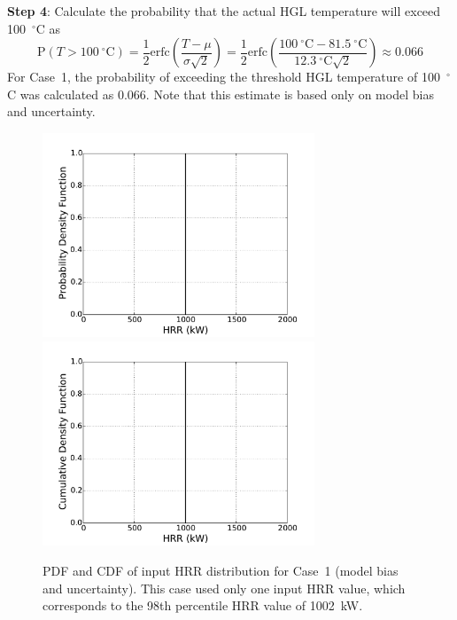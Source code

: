 \documentclass[12pt]{article}
\begin{document}
\textbf{Step 4}: Calculate the probability that the actual HGL temperature will exceed 100~$^\circ$C as
\begin{equation}
\textrm{P}(T > 100~^\circ\textrm{C}) = \frac{1}{2} \textrm{erfc} \left( \frac{T - \mu}{\sigma \sqrt{2}} \right) = \frac{1}{2} \textrm{erfc} \left( \frac{100~^\circ\textrm{C} - 81.5~^\circ\textrm{C}}{12.3~^\circ\textrm{C} \sqrt{2}} \right) \approx 0.066
\end{equation}
For Case~1, the probability of exceeding the threshold HGL temperature of 100~$^\circ$C was calculated as 0.066. Note that this estimate is based only on model bias and uncertainty.

\clearpage

\begin{figure}[p]
\includegraphics[width=3.2in]{Figures/input_PDF_point}
\includegraphics[width=3.2in]{Figures/input_CDF_point}
\caption{PDF and CDF of input HRR distribution for Case~1 (model bias and uncertainty). This case used only one input HRR value, which corresponds to the 98th percentile HRR value of 1002~kW.}
\label{fig:case_1_input_distributions}
\end{figure}
\end{document}
